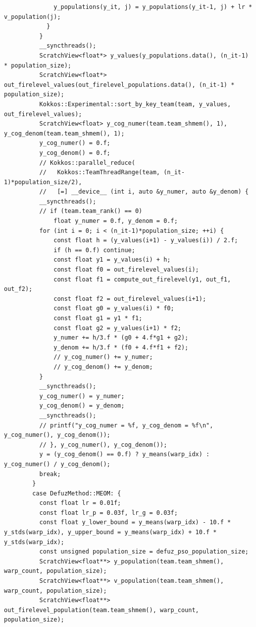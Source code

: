 \begin{verbatim}
              y_populations(y_it, j) = y_populations(y_it-1, j) + lr * v_population(j);
            }
          }
          __syncthreads();
          ScratchView<float*> y_values(y_populations.data(), (n_it-1) * population_size);
          ScratchView<float*> out_firelevel_values(out_firelevel_populations.data(), (n_it-1) * population_size);
          Kokkos::Experimental::sort_by_key_team(team, y_values, out_firelevel_values);
          ScratchView<float> y_cog_numer(team.team_shmem(), 1), y_cog_denom(team.team_shmem(), 1);
          y_cog_numer() = 0.f;
          y_cog_denom() = 0.f;
          // Kokkos::parallel_reduce(
          //   Kokkos::TeamThreadRange(team, (n_it-1)*population_size/2),
          //   [=] __device__ (int i, auto &y_numer, auto &y_denom) {
          __syncthreads();
          // if (team.team_rank() == 0)
              float y_numer = 0.f, y_denom = 0.f;
          for (int i = 0; i < (n_it-1)*population_size; ++i) {
              const float h = (y_values(i+1) - y_values(i)) / 2.f;
              if (h == 0.f) continue;
              const float y1 = y_values(i) + h;
              const float f0 = out_firelevel_values(i);
              const float f1 = compute_out_firelevel(y1, out_f1, out_f2);
              const float f2 = out_firelevel_values(i+1);
              const float g0 = y_values(i) * f0;
              const float g1 = y1 * f1;
              const float g2 = y_values(i+1) * f2;
              y_numer += h/3.f * (g0 + 4.f*g1 + g2);
              y_denom += h/3.f * (f0 + 4.f*f1 + f2);
              // y_cog_numer() += y_numer;
              // y_cog_denom() += y_denom;
          }
          __syncthreads();
          y_cog_numer() = y_numer;
          y_cog_denom() = y_denom;
          __syncthreads();
          // printf("y_cog_numer = %f, y_cog_denom = %f\n", y_cog_numer(), y_cog_denom());
          // }, y_cog_numer(), y_cog_denom());
          y = (y_cog_denom() == 0.f) ? y_means(warp_idx) : y_cog_numer() / y_cog_denom();
          break;
        }
        case DefuzMethod::MEOM: {
          const float lr = 0.01f;
          const float lr_p = 0.03f, lr_g = 0.03f;
          const float y_lower_bound = y_means(warp_idx) - 10.f * y_stds(warp_idx), y_upper_bound = y_means(warp_idx) + 10.f * y_stds(warp_idx);
          const unsigned population_size = defuz_pso_population_size;
          ScratchView<float**> y_population(team.team_shmem(), warp_count, population_size);
          ScratchView<float**> v_population(team.team_shmem(), warp_count, population_size);
          ScratchView<float**> out_firelevel_population(team.team_shmem(), warp_count, population_size);

\end{verbatim}
